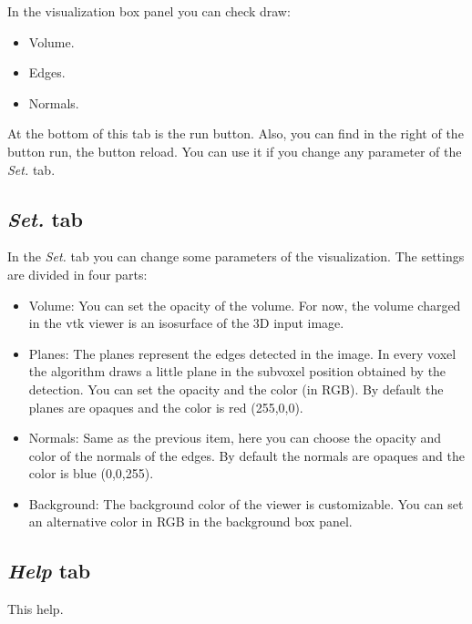 \documentclass{article}
\begin{document}
In the visualization box panel you can check draw: 
\begin{itemize}
	\item Volume.
	\item Edges.
	\item Normals.
\end{itemize}

At the bottom of this tab is the run button. Also, you can find in the right of the button run, the button reload. You can use it if you change any parameter of the \emph{Set.} tab.

\subsection{\emph{Set.} tab}
In the \emph{Set.} tab you can change some parameters of the visualization. The settings are divided in four parts:
\begin{itemize}
	\item Volume: You can set the opacity of the volume. For now, the volume charged in the vtk viewer is an isosurface of the 3D input image.
	\item Planes: The planes represent the edges detected in the image. In every voxel the algorithm draws a little plane in the subvoxel position obtained by the detection. You can set the opacity and the color (in RGB). By default the planes are opaques and the color is red (255,0,0).
	\item Normals: Same as the previous item, here you can choose the opacity and color of the normals of the edges. By default the normals are opaques and the color is blue (0,0,255).
	\item Background: The background color of the viewer is customizable. You can set an alternative color in RGB in the background box panel. 
\end{itemize} 

\subsection{\emph{Help} tab}
This help.
\end{document}
